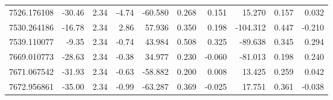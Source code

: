 \documentclass{aa}
\begin{document}
\begin{appendix}
\begin{table}
\begin{tabular}{lrrrrrrrrr}
7526.176108 & -30.46 & 2.34 & -4.74 & -60.580 & 0.268 &  0.151 &   15.270 & 0.157 &  0.032 \\
7530.264186 & -16.78 & 2.34 &  2.86 &  57.936 & 0.350 &  0.198 & -104.312 & 0.447 & -0.210 \\
7539.110077 &  -9.35 & 2.34 & -0.74 &  43.984 & 0.508 &  0.325 &  -89.638 & 0.345 &  0.294 \\
7669.010773 & -28.63 & 2.34 & -0.38 &  34.977 & 0.230 & -0.060 &  -81.013 & 0.198 &  0.240 \\
7671.067542 & -31.93 & 2.34 & -0.63 & -58.882 & 0.200 &  0.008 &   13.425 & 0.259 &  0.042 \\
7672.956861 & -35.00 & 2.34 & -0.99 & -63.287 & 0.369 & -0.025 &   17.751 & 0.361 & -0.038 \\
\hline
\end{tabular}
\end{table}

\end{appendix}
\end{document}
